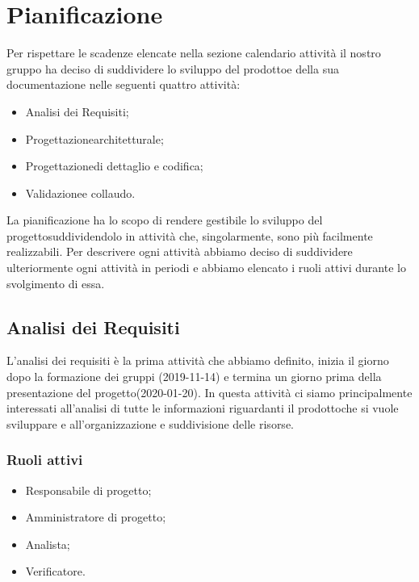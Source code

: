 \section{Pianificazione} 
Per rispettare le scadenze elencate nella sezione calendario attività il nostro gruppo ha deciso di suddividere lo sviluppo del prodotto\glosp e della sua documentazione nelle seguenti quattro attività:
\begin{itemize}
	\item Analisi dei Requisiti;
	\item Progettazione\glosp architetturale;
	\item Progettazione\glosp di dettaglio e codifica;
	\item Validazione\glosp e collaudo.
\end{itemize}
La pianificazione ha lo scopo di rendere gestibile lo sviluppo del progetto\glosp suddividendolo in attività che, singolarmente, sono più facilmente realizzabili. Per descrivere ogni attività abbiamo deciso di suddividere ulteriormente ogni attività in periodi e abbiamo elencato i ruoli attivi durante lo svolgimento di essa.

\subsection{Analisi dei Requisiti}
L'analisi dei requisiti è la prima attività che abbiamo definito, inizia il giorno dopo la formazione dei gruppi (2019-11-14) e termina un giorno prima della presentazione del progetto\glosp (2020-01-20). In questa attività ci siamo principalmente interessati all'analisi di tutte le informazioni riguardanti il prodotto\glosp che si vuole sviluppare e all'organizzazione e suddivisione delle risorse.

\subsubsection{Ruoli attivi}
\begin{itemize}
	\item Responsabile di progetto\glo;
	\item Amministratore di progetto\glo;
	\item Analista;
	\item Verificatore.
\end{itemize}

